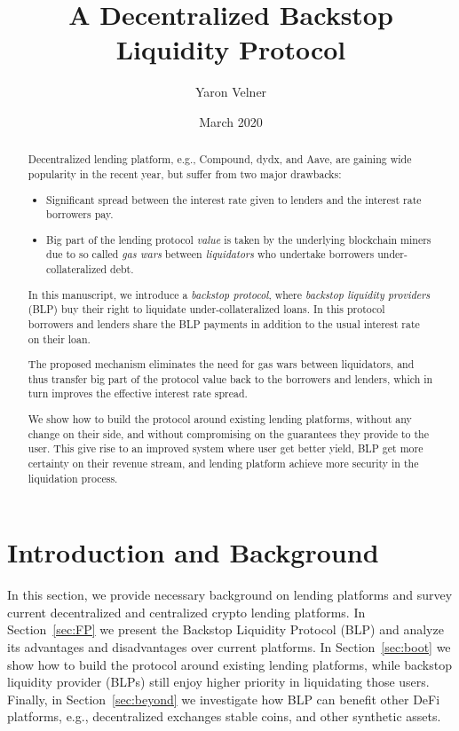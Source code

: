 \documentclass{article}
\title{A Decentralized Backstop Liquidity Protocol}
\author{Yaron Velner}
\date{March 2020}
\begin{document}
\maketitle

\begin{abstract}
Decentralized lending platform, e.g., Compound, dydx, and Aave, are gaining wide popularity in the recent year, but suffer from two major drawbacks:
\begin{itemize}
    \item Significant spread between the interest rate given to lenders and the interest rate borrowers pay.
    \item Big part of the lending protocol \emph{value} is taken by the underlying blockchain miners due to so called \emph{gas wars} between \emph{liquidators} who undertake borrowers under-collateralized debt.
\end{itemize}
In this manuscript, we introduce a \emph{backstop protocol}, where \emph{backstop liquidity providers} (BLP) buy their right to liquidate under-collateralized loans. In this protocol borrowers and lenders share the BLP payments in addition to the usual interest rate on their loan.

The proposed mechanism eliminates the need for gas wars between liquidators, and thus transfer big part of the protocol value back to the borrowers and lenders, which in turn improves the effective interest rate spread.

We show how to build the protocol around existing lending platforms, without any change on their side, and without compromising on the guarantees they provide to the user.
This give rise to an improved system where user get better yield, BLP get more certainty on their revenue stream, and lending platform achieve more security in the liquidation process. 
\end{abstract}

\section{Introduction and Background}
In this section, we provide necessary background on lending platforms and survey current decentralized and centralized crypto lending platforms.
In Section~\ref{sec:FP} we present the Backstop Liquidity Protocol (BLP) and analyze its advantages and disadvantages over current platforms.
In Section~\ref{sec:boot} we show how to build the protocol around existing lending platforms, while backstop liquidity provider (BLPs) still enjoy higher priority in liquidating those users.   
Finally, in Section~\ref{sec:beyond} we investigate how BLP can benefit other DeFi platforms, e.g., decentralized exchanges stable coins, and other synthetic assets.
\end{document}
